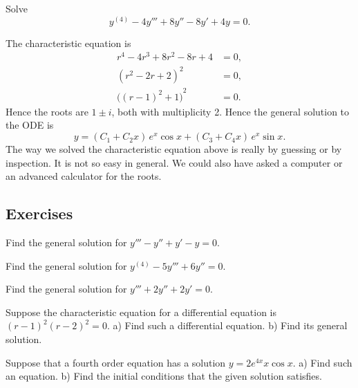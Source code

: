 \documentclass[12pt]{book}
\begin{document}
\begin{example}
Solve
\begin{equation*}
y^{(4)} - 4 y''' + 8 y'' - 8 y' + 4y = 0 .
\end{equation*}

The characteristic equation is
\begin{align*}
r^4 - 4 r^3 + 8 r^2 - 8 r + 4 & = 0 , \\
{(r^2-2r+2)}^2 & = 0 , \\
{\bigl({(r-1)}^2+1\bigr)}^2 & = 0 .
\end{align*}
Hence the roots are $1 \pm i$, both with multiplicity 2.  Hence the general
solution to the ODE is
\begin{equation*}
y = 
( C_1 + C_2 x ) \, e^{x} \cos x
+
( C_3 + C_4 x ) \, e^{x} \sin x .
\end{equation*}
The way we solved the characteristic equation above is really by guessing or
by inspection.  It is not so easy in general.  We could also have asked
a computer or an advanced calculator for the roots.
\end{example}


\subsection{Exercises}

\begin{exercise}
Find the general solution for $y''' - y'' + y' - y = 0$.
\end{exercise}

\begin{exercise}
Find the general solution for $y^{(4)} - 5 y''' + 6 y'' = 0$.
\end{exercise}

\begin{exercise}
Find the general solution for $y''' + 2 y'' + 2 y' = 0$.
\end{exercise}

\begin{exercise}
Suppose the characteristic equation for a differential equation is
${(r-1)}^2{(r-2)}^2 = 0$.  a) Find such a differential equation.
b) Find its general solution.
\end{exercise}

\begin{exercise} \label{hol:eqfromsolex}
Suppose that a fourth order equation has a solution
$y = 2 e^{4x} x \cos x$.  
a) Find such an equation.  b) Find the initial conditions that the given
solution satisfies.
\end{exercise}
\end{document}
